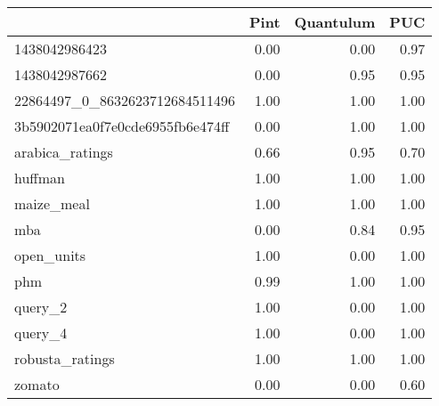 \begin{tabular}{lrrr}
\toprule
{} &  Pint &  Quantulum &   PUC \\
\midrule
1438042986423                    &  0.00 &       0.00 &  0.97 \\
1438042987662                    &  0.00 &       0.95 &  0.95 \\
22864497\_0\_8632623712684511496   &  1.00 &       1.00 &  1.00 \\
3b5902071ea0f7e0cde6955fb6e474ff &  0.00 &       1.00 &  1.00 \\
arabica\_ratings                  &  0.66 &       0.95 &  0.70 \\
huffman                          &  1.00 &       1.00 &  1.00 \\
maize\_meal                       &  1.00 &       1.00 &  1.00 \\
mba                              &  0.00 &       0.84 &  0.95 \\
open\_units                       &  1.00 &       0.00 &  1.00 \\
phm                              &  0.99 &       1.00 &  1.00 \\
query\_2                          &  1.00 &       0.00 &  1.00 \\
query\_4                          &  1.00 &       0.00 &  1.00 \\
robusta\_ratings                  &  1.00 &       1.00 &  1.00 \\
zomato                           &  0.00 &       0.00 &  0.60 \\
\bottomrule
\end{tabular}
